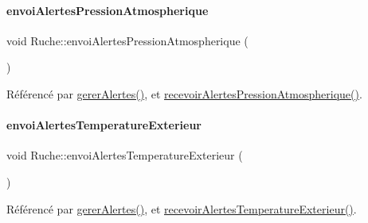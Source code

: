 \paragraph{\texorpdfstring{envoi\+Alertes\+Pression\+Atmospherique}{envoiAlertesPressionAtmospherique}}
{\footnotesize\ttfamily void Ruche\+::envoi\+Alertes\+Pression\+Atmospherique (\begin{DoxyParamCaption}\item[{\hyperlink{parametres_8h_aaa6de8207c94675264c90b10b613368d}{Seuils\+Alertes}}]{ }\end{DoxyParamCaption})\hspace{0.3cm}{\ttfamily [signal]}}



Référencé par \hyperlink{class_ruche_a80f3538f081aea887d7199f114dfca01}{gerer\+Alertes()}, et \hyperlink{class_ruche_aa649f21e5d2a196bc7fbc570dc731ade}{recevoir\+Alertes\+Pression\+Atmospherique()}.

\mbox{\label{class_ruche_a5bb36a4bb9692a744a1b7ebc5fc59f57}} 
\paragraph{\texorpdfstring{envoi\+Alertes\+Temperature\+Exterieur}{envoiAlertesTemperatureExterieur}}
{\footnotesize\ttfamily void Ruche\+::envoi\+Alertes\+Temperature\+Exterieur (\begin{DoxyParamCaption}\item[{\hyperlink{parametres_8h_aaa6de8207c94675264c90b10b613368d}{Seuils\+Alertes}}]{ }\end{DoxyParamCaption})\hspace{0.3cm}{\ttfamily [signal]}}



Référencé par \hyperlink{class_ruche_a80f3538f081aea887d7199f114dfca01}{gerer\+Alertes()}, et \hyperlink{class_ruche_af09b04e9a415ad3df9941068b74046fc}{recevoir\+Alertes\+Temperature\+Exterieur()}.

\mbox{\label{class_ruche_ac2f37831cb8c70ac4df2a3ac805b728b}} 
